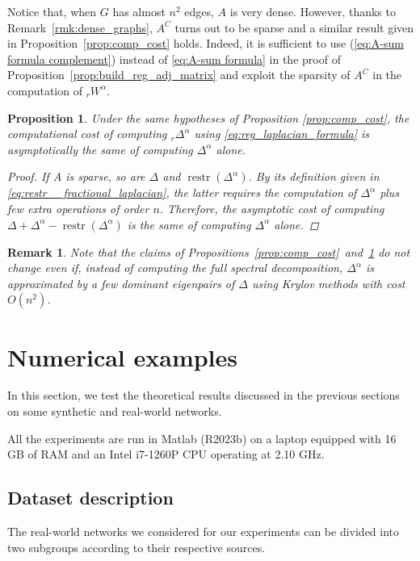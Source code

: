\documentclass[a4paper,12pt]{article}
\newtheorem{remark}{Remark}
\newtheorem{proposition}{Proposition}
\DeclareMathOperator{\restr}{restr}
\newcommand{\fL}{\Delta^\alpha}
\newcommand{\rfL}{{}_r\fL}
\newcommand{\fW}{W^\alpha}
\newcommand{\rfW}{{}_r\fW}
\begin{document}
Notice that, when $G$ has almost $n^2$ edges, $A$ is very dense. However, thanks to Remark~\ref{rmk:dense_graphs}, $A^C$ turns out to be sparse and a similar result given in Proposition~\ref{prop:comp_cost} holds. Indeed, it is sufficient to use (\ref{eq:A-sum formula complement}) instead of \eqref{eq:A-sum formula} in the proof of Proposition~\ref{prop:build_reg_adj_matrix} and exploit the sparsity of $A^C$ in the computation of $\rfW$.

\begin{proposition}\label{prop:comp_cost_laplacian} Under the same hypotheses of Proposition \ref{prop:comp_cost}, the computational cost of computing $\rfL$ using \eqref{eq:reg_laplacian_formula} is asymptotically the same of computing $\fL$ alone.  
\begin{proof} 
If $A$ is sparse, so are $\Delta$ and $\restr(\fL)$. By its definition given in \eqref{eq:restr__fractional_laplacian}, the latter requires the computation of $\fL$ plus few extra operations of order $n$. Therefore, the asymptotic cost of computing $  \Delta+\fL - \restr(\fL)$  is the same of computing $\fL$ alone.  
 \end{proof}
\end{proposition} 

\begin{remark}
Note that the claims of Propositions~\ref{prop:comp_cost}~and~\ref{prop:comp_cost_laplacian} do not change even if, instead of computing the full spectral decomposition, $\Delta^{\alpha}$ is approximated by a few dominant eigenpairs of $\Delta$ using Krylov methods with cost $O(n^2)$.    
\end{remark}

\section{Numerical examples} \label{sec:numerical_examples}

In this section, we test the theoretical results discussed in the previous sections on some synthetic and real-world networks.  

All the experiments are run in Matlab (R2023b) on a laptop equipped with 16 GB of RAM and an Intel i7-1260P CPU operating at 2.10 GHz.

\subsection{Dataset description}

The real-world networks we considered for our experiments can be divided into two subgroups according to their respective sources.
\end{document}
